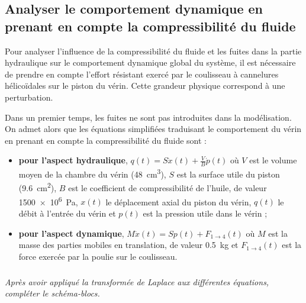 \documentclass[10pt,fleqn]{article} %
\begin{document}
\begin{multicols}{2}
\section*{Analyser le comportement dynamique en prenant en compte la compressibilité du fluide}


 Pour analyser l'influence de la compressibilité du fluide et les fuites dans la partie hydraulique sur le comportement dynamique global du système, il est nécessaire de prendre en compte l'effort résistant exercé par le coulisseau à cannelures hélicoïdales sur le piston du vérin. Cette grandeur physique correspond à une perturbation.

Dans un premier temps, les fuites ne sont pas introduites dans la modélisation. On admet alors que les équations simplifiées traduisant le comportement du vérin en prenant en compte la compressibilité du fluide sont :
\begin{itemize}
\item \textbf{pour l'aspect hydraulique}, $q(t)=S\dot{x}(t)+\frac{V}{B} \dot{p}(t)$ où $V$ est le volume moyen de la chambre du vérin (\SI{48}{cm^3}), $S$ est la surface utile du piston  (\SI{9.6}{cm^2}), $B$ est le coefficient de compressibilité de l'huile, de valeur \SI{1500e6}{Pa}, $x(t)$  le déplacement axial du piston du vérin, $q(t)$  le débit à l'entrée du vérin et $p(t)$ est la pression utile dans le vérin ;
\item \textbf{pour l'aspect dynamique}, $M\ddot{x}(t)=Sp(t)+F_{1\to 4} (t)$ où $M$ est la masse des parties mobiles en translation, de valeur \SI{0,5}{kg} et $F_{1\to 4}(t)$ est la force exercée par la poulie sur le coulisseau.
\end{itemize}


\subparagraph{}\textit{Après avoir appliqué la transformée de Laplace aux différentes équations, compléter le schéma-blocs.}%

\begin{center}
{}
\end{center}


\end{multicols}
\end{document}
